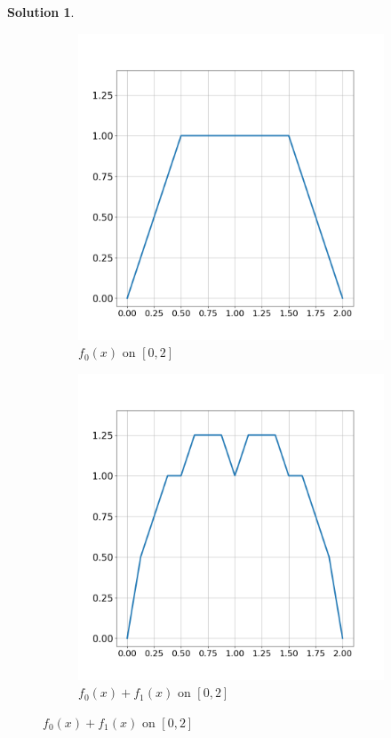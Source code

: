 \documentclass[12pt]{article}
\theoremstyle{definition}
\theoremstyle{exercise}
\theoremstyle{solution}
\newtheorem*{solution}{Solution}
\begin{document}
\begin{solution}
\begin{enumerate}
        \begin{figure}
            \centering
            \begin{subfigure}{0.49\textwidth}
              \centering
              \includegraphics[width=\linewidth]{UA_Section_5_4_Figure_2.png}
              \caption{\( f_0(x) \) on \( [0, 2] \)}
              \label{fig:1sub1}
            \end{subfigure}%
            \begin{subfigure}{0.49\textwidth}
              \centering
              \includegraphics[width=\linewidth]{UA_Section_5_4_Figure_3.png}
              \caption{\( f_0(x) + f_1(x) \) on \( [0, 2] \)}
              \label{fig:1sub2}
            \end{subfigure}


\end{figure}
\end{enumerate}
\end{solution}
\end{document}
